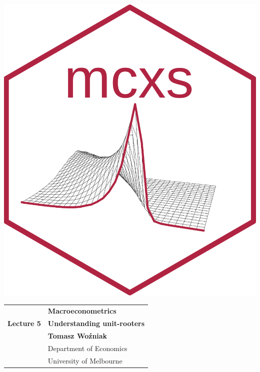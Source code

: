 \documentclass[notes,blackandwhite,mathsans]{beamer}
\begin{document}



\begin{frame}
\centering\includegraphics[scale=1.87]{mcxs.png}
\end{frame}






{
\begin{frame}

\vspace{1cm}
\begin{tabular}{rl}
&\textbf{\LARGE\color{mcxs2} Macroeconometrics}\\[8ex]
\textbf{\Large Lecture 5}&\textbf{\Large\color{mcxs2}Understanding unit-rooters}\\[19ex]
&\textbf{Tomasz Wo\'zniak}\\[1ex]
&{\small\color{mcxs2} Department of Economics}\\
&{\small\color{mcxs2}University of Melbourne}
\end{tabular}

\end{frame}
}
\end{document}
